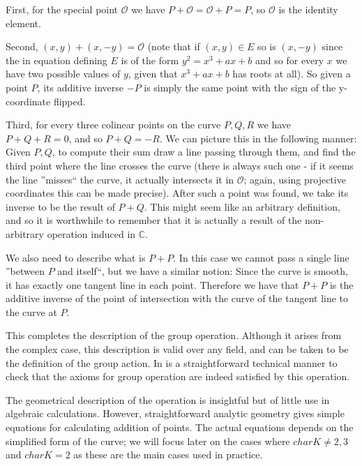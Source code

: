 \documentclass[11pt,english]{article}
\begin{document}
First, for the special point $\mathcal{O}$ we have $P+\mathcal{O}=\mathcal{O}+P=P$, so $\mathcal{O}$ is the identity element.

Second, $(x,y)+(x,-y)=\mathcal{O}$ (note that if $(x,y)\in E$ so is $(x,-y)$ since the in equation defining $E$ is of the form $y^2=x^3+ax+b$ and so for
every $x$ we have two possible values of $y$, given that $x^3+ax+b$ has roots at all). So given a point $P$, its additive inverse $-P$ is simply the same point
with the sign of the y-coordinate flipped.

Third, for every three colinear points on the curve $P,Q,R$ we have $P+Q+R=0$, and so $P+Q=-R$. We can picture this in the following manner: Given $P,Q$,
to compute their sum draw a line passing through them, and find the third point where the line crosses the curve (there is always such one - if it seems the line 
''misses`` the curve, it actually intersects it in $\mathcal{O}$; again, using projective coordinates this can be made precise). After such a point was found, we
take its inverse to be the result of $P+Q$. This might seem like an arbitrary definition, and so it is worthwhile to remember that it is actually a result of the non-arbitrary
operation induced in $\mathbb{C}$.

We also need to describe what is $P+P$. In this case we cannot pass a single line ''between $P$ and itself``, but we have a similar notion: Since the curve is smooth,
it has exactly one tangent line in each point. Therefore we have that $P+P$ is the additive inverse of the point of intersection with the curve of the tangent line to the curve at $P$.

This completes the description of the group operation. Although it arises from the complex case, this description is valid over any field, and can be taken to be
the definition of the group action. In is a straightforward technical manner to check that the axioms for group operation are indeed satisfied by this operation.

The geometrical description of the operation is insightful but of little use in algebraic calculations. However, straightforward analytic geometry
gives simple equations for calculating addition of points. The actual equations depends on the simplified form of the curve; we will focus later on the cases
where $charK\ne 2,3$ and $charK=2$ as these are the main cases used in practice.
\end{document}
